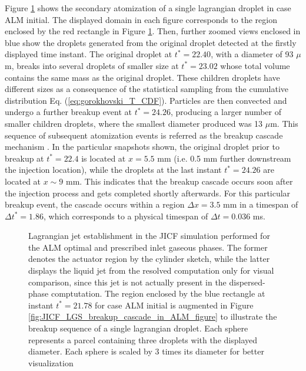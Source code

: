 Figure \ref{fig:JICF_LGS_spray_establishment} shows the secondary atomization of a single lagrangian droplet in case ALM initial. The displayed domain in each figure corresponds to the region enclosed by the red rectangle in Figure \ref{fig:JICF_LGS_spray_establishment}. Then, further zoomed views enclosed in blue show the droplets generated from the original droplet detected at the firstly displayed time instant. The original droplet at $t^* = 22.40$, with a diameter of 93 $\mu$m, breaks into several droplets of smaller size at $t^* = 23.02$ whose total volume contains the same mass as the original droplet. These children droplets have different sizes as a consequence of the statistical sampling from the cumulative distribution Eq. (\ref{eq:gorokhovski_T_CDF}). Particles are then convected and undergo a further breakup event at $t^* = 24.26$, producing a larger number of smaller children droplets, where the smallest diameter produced was 13 $\mu$m. This sequence of subsequent atomization events is referred as the breakup cascade mechanism . In the particular snapshots shown, the original droplet prior to breakup at $t^* = 22.4$ is located at $x = 5.5$ mm (i.e. 0.5 mm further downstream the injection location), while the droplets at the last instant $t^* = 24.26$ are located at $x \sim 9$ mm. This indicates that the breakup cascade occurs soon after the injection process and gets completed shortly afterwards. For this particular breakup event, the cascade occurs within a region $\Delta x = 3.5$ mm in a timespan of $\Delta t^* = 1.86$, which corresponds to a physical timespan of $\Delta t = 0.036$ ms. 



\begin{figure}[h!]
	\centering	{}
	\caption[Lagrangian jet establishment in the JICF simulation performed for the ALM optimal and prescribed inlet gaseous phases]{Lagrangian jet establishment in the JICF simulation performed for the ALM optimal and prescribed inlet gaseous phases. The former denotes the actuator region by the cylinder sketch, while the latter displays the liquid jet from the resolved computation only for visual comparison, since this jet is not actually present in the dispersed-phase comptutation. The region enclosed by the blue rectangle at instant $t^* = 21.78$ for case ALM initial is augmented in Figure \ref{fig:JICF_LGS_breakup_cascade_in_ALM_figure} to illustrate the breakup sequence of a single lagrangian droplet. Each sphere represents a parcel containing three droplets with the displayed diameter. Each sphere is scaled by 3 times its diameter for better visualization}
	\label{fig:JICF_LGS_spray_establishment}
\end{figure}


